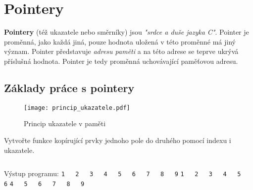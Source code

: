 \chapter{Pointery}
\minitoc
\newpage
  \textbf{Pointery} (též ukazatele nebo směrníky) jsou \emph{"srdce a duše jazyka C"}. Pointer je proměnná, jako každá jiná, pouze hodnota uložená v této proměnné má jiný význam. Pointer představuje \textit{adresu paměti} a na této adrese se teprve ukrývá příslušná hodnota. Pointer je tedy proměnná uchovávající paměťovou adresu.\cite{Herout}

  \section{Základy práce s pointery}
    \begin{figure}
      \centering
      \texttt{[image: princip\_ukazatele.pdf]}
      \caption{Princip ukazatele v paměti}
      \label{figure:pointer1}
    \end{figure}
    \begin{example}Vytvořte funkce kopírující prvky jednoho pole do druhého pomocí indexu i ukazatele.
    
      
      \begin{lstlisting}[caption=\texttt{CPYARRY.C} Kopíruje prvky jednoho pole do druhého.]
      \end{lstlisting}
      Výstup programu:                                                     \newline
        \lstinline[basicstyle=\ttfamily]!1   2   3   4   5   6   7   8   9!\newline
        \lstinline[basicstyle=\ttfamily]!1   2   3   4   5   6!            \newline
        \lstinline[basicstyle=\ttfamily]!4   5   6   7   8   9!            \newline
    \end{example} 